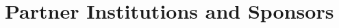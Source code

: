 \documentclass[openany, parskip=full, 12pt, a4]{scrbook}
\begin{document}


\chapter{Partner Institutions and Sponsors}



\newpage


\pagecolor{myblue}
\thispagestyle{empty}
\mbox{}
\end{document}
